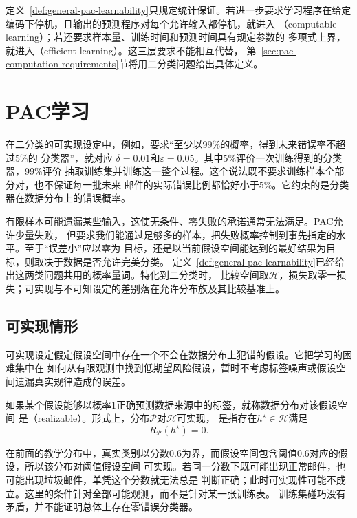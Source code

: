 定义~\ref{def:general-pac-learnability}只规定统计保证。若进一步要求学习程序在给定
编码下停机，且输出的预测程序对每个允许输入都停机，就进入
（computable learning）；若还要求样本量、训练时间和预测时间具有规定参数的
多项式上界，就进入（efficient learning）。这三层要求不能相互代替，
第~\ref{sec:pac-computation-requirements}节将用二分类问题给出具体定义。

\section{PAC学习}
\label{sec:pac-learning}

在二分类的可实现设定中，例如，要求“至少以99\%的概率，得到未来错误率不超过5\%的
分类器”，就对应
$\delta=0.01$和$\varepsilon=0.05$。其中5\%评价一次训练得到的分类器，99\%评价
抽取训练集并训练这一整个过程。这个说法既不要求训练样本全部分对，也不保证每一批未来
邮件的实际错误比例都恰好小于5\%。它约束的是分类器在数据分布上的错误概率。

有限样本可能遗漏某些输入，这使无条件、零失败的承诺通常无法满足。PAC允许少量失败，
但要求我们能通过足够多的样本，把失败概率控制到事先指定的水平。至于“误差小”应以零为
目标，还是以当前假设空间能达到的最好结果为目标，则取决于数据是否允许完美分类。
定义~\ref{def:general-pac-learnability}已经给出这两类问题共用的概率量词。特化到二分类时，
比较空间取$\mathcal H$，损失取零一损失；可实现与不可知设定的差别落在允许分布族及其比较基准上。

\subsection{可实现情形}

可实现设定假定假设空间中存在一个不会在数据分布上犯错的假设。它把学习的困难集中在
如何从有限观测中找到低期望风险假设，暂时不考虑标签噪声或假设空间遗漏真实规律造成的误差。

\begin{definition}[可实现性]
\label{def:realizability}
如果某个假设能够以概率1正确预测数据来源中的标签，就称数据分布对该假设空间
是（realizable）。形式上，分布$\mathcal P$对$\mathcal H$可实现，
是指存在$h^\star\in\mathcal H$满足
\[
 R_{\mathcal P}(h^\star)=0.
\]
\end{definition}

在前面的教学分布中，真实类别以分数0.6为界，而假设空间包含阈值0.6对应的假设，所以该分布对阈值假设空间
可实现。若同一分数下既可能出现正常邮件，也可能出现垃圾邮件，单凭这个分数就无法总是
判断正确；此时可实现性可能不成立。这里的条件针对全部可能观测，而不是针对某一张训练表。
训练集碰巧没有矛盾，并不能证明总体上存在零错误分类器。


